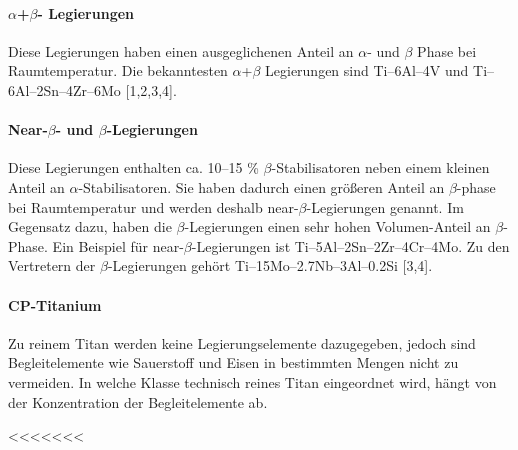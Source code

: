 \paragraph{$\alpha$+$\beta$- Legierungen}
Diese Legierungen haben einen ausgeglichenen Anteil an $\alpha$- und $\beta$ Phase bei Raumtemperatur. Die bekanntesten $\alpha$+$\beta$ Legierungen sind Ti–6Al–4V und Ti–6Al–2Sn–4Zr–6Mo [1,2,3,4].

\paragraph{Near-$\beta$- und $\beta$-Legierungen}
Diese Legierungen enthalten ca. 10--15 \% $\beta$-Stabilisatoren neben einem kleinen Anteil an $\alpha$-Stabilisatoren. Sie haben dadurch einen größeren Anteil an $\beta$-phase bei Raumtemperatur und werden deshalb near-$\beta$-Legierungen genannt. Im Gegensatz dazu, haben die $\beta$-Legierungen einen sehr hohen Volumen-Anteil an $\beta$-Phase. Ein Beispiel für near-$\beta$-Legierungen ist Ti–5Al–2Sn–2Zr–4Cr–4Mo. Zu den Vertretern der $\beta$-Legierungen gehört Ti–15Mo–2.7Nb–3Al–0.2Si [3,4].

\paragraph{CP-Titanium} 
Zu reinem Titan werden keine Legierungselemente dazugegeben, jedoch sind Begleitelemente wie Sauerstoff und Eisen in bestimmten Mengen nicht zu vermeiden. In welche Klasse technisch reines Titan eingeordnet wird, hängt von der Konzentration der Begleitelemente ab. 


<<<<<<<
